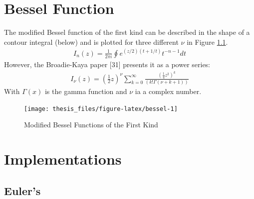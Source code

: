 \documentclass[12pt,twoside]{reedthesis}
\theoremstyle{definition}
\theoremstyle{definition}
\theoremstyle{remark}
\begin{document}
  \chapter{Bessel Function}\label{bessel}
  
  The modified Bessel function of the first kind can be described in the
  shape of a contour integral (below) and is plotted for three different
  \(\nu\) in Figure \ref{fig:bessel}.
  \begin{align*} 
  I_n(z)= \frac{1}{2 \pi i}\displaystyle \oint e^{(z/2)(t+1/t)}t^{-n-1}dt
  \end{align*}
  However, the Broadie-Kaya paper {[}31{]} presents it as a power series:
  \begin{align*}
  I_{\nu}(z)= \left(\frac{1}{2}z\right)^\nu \displaystyle \sum_{k=0}^{\infty}{\frac{\left(\frac{1}{4}z^2\right)^k}{\left(k!\Gamma \left(\nu+k+1\right)\right)}}
  \end{align*}
  With \(\Gamma(x)\) is the gamma function and \(\nu\) ia a complex
  number.
  \begin{figure}
  
  {\centering \texttt{[image: thesis\_files/figure-latex/bessel-1]} 
  
  }
  
  \caption{Modified Bessel Functions of the First Kind \label{bessel}}\label{fig:bessel}
  \end{figure}
  \chapter{Implementations}\label{implementations}
  
  \section{Euler's}\label{eulerapp}
  
\end{document}
